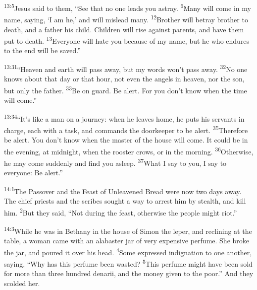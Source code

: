 \documentclass[openany,12pt,english]{book}
\newenvironment{para}{\par\pretolerance=100\tolerance=200\setlength{\emergencystretch}{0.6em}\relax}{\par}
\begin{document}
\begin{para}
    \textsuperscript{13:5}\thinspace{}Jesus said to them, “See that no one leads you a\-stray.
    \textsuperscript{6}\thinspace{}Man\-y will come in my name, say\-ing, ‘I am he,’ and will mis\-lead man\-y.
    \textsuperscript{12}\thinspace{}Broth\-er will be\-tray broth\-er to death, and a fa\-ther his child. Chil\-dren will rise a\-gainst parents, and have them put to death.
    \textsuperscript{13}\thinspace{}Eve\-ry\-one will hate you be\-cause of my name, but he who endures to the end will be saved.”
\end{para}

\begin{para}
    \textsuperscript{13:31}\thinspace{}“Heav\-en and earth will pass a\-way, but my words won't pass a\-way.
    \textsuperscript{32}\thinspace{}No one knows a\-bout that day or that hour, not e\-ven the angels in heav\-en, nor the son, but on\-ly the fa\-ther.
    \textsuperscript{33}\thinspace{}Be on guard. Be a\-lert. For you don't know when the time will come.”
\end{para}

\begin{para}
    \textsuperscript{13:34}\thinspace{}“It's like a man on a jour\-ney: when he leaves home, he puts his servants in charge, each with a task, and commands the door\-keep\-er to be a\-lert.
    \textsuperscript{35}\thinspace{}There\-fore be a\-lert. You don't know when the mas\-ter of the house will come. It could be in the eve\-ning, at mid\-night, when the roost\-er crows, or in the morn\-ing.
    \textsuperscript{36}\thinspace{}Oth\-er\-wise, he may come sud\-den\-ly and find you a\-sleep.
    \textsuperscript{37}\thinspace{}What I say to you, I say to eve\-ry\-one: Be a\-lert.”
\end{para}

\bigskip{}

\begin{para}
    \textsuperscript{14:1}\thinspace{}The Passover and the Feast of Un\-leav\-ened Bread were now two days a\-way. The chief priests and the scribes sought a way to ar\-rest him by stealth, and kill him.
    \textsuperscript{2}\thinspace{}But they said, “Not dur\-ing the feast, oth\-er\-wise the peo\-ple might ri\-ot.”
\end{para}

\begin{para}
    \textsuperscript{14:3}\thinspace{}While he was in Bethany in the house of Simon the lep\-er, and re\-clin\-ing at the ta\-ble, a wom\-an came with an al\-a\-bas\-ter jar of ver\-y ex\-pen\-sive per\-fume. She broke the jar, and poured it o\-ver his head.
    \textsuperscript{4}\thinspace{}Some expressed in\-dig\-na\-tion to one an\-oth\-er, say\-ing, “Why has this per\-fume been wast\-ed?
    \textsuperscript{5}\thinspace{}This per\-fume might have been sold for more than three hun\-dred de\-nar\-i\-i, and the mon\-ey giv\-en to the poor.” And they scolded her.
\end{para}
\end{document}
